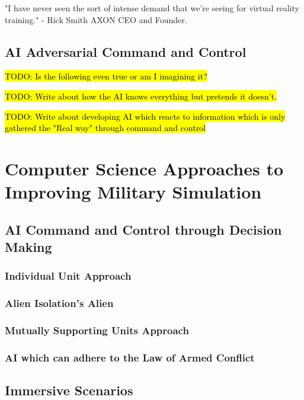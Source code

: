 \documentclass{article}
\begin{document}
"I have never seen the sort of intense demand that we're seeing for virtual reality training." - Rick Smith AXON CEO and Founder.


\subsection{AI Adversarial Command and Control}

\hl{TODO: Is the following even true or am I imagining it?}

\hl{TODO: Write about how the AI knows everything but pretends it doesn't.}

\hl{TODO: Write about developing AI which reacts to information which is only gathered the "Real way" through command and control}

\section{Computer Science Approaches to Improving Military Simulation}

\subsection{AI Command and Control through Decision Making}

\subsubsection{Individual Unit Approach}

\subsubsection{Alien Isolation's Alien}

\subsubsection{Mutually Supporting Units Approach}

\subsubsection{AI which can adhere to the Law of Armed Conflict}

\subsection{Immersive Scenarios}
\end{document}
